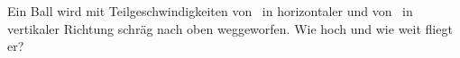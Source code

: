 Ein Ball wird mit Teilgeschwindigkeiten von \vxO\ in horizontaler und von \vyO\ in vertikaler Richtung schräg nach oben weggeworfen. Wie hoch und wie weit fliegt er?
